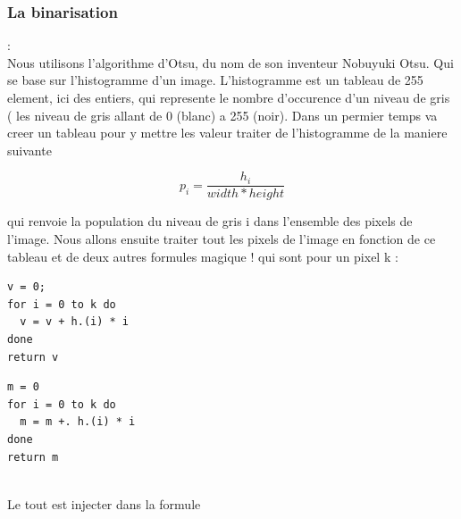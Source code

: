 \documentclass[12pt]{article}
\begin{document}
\subsubsection{La binarisation}
:\\
Nous utilisons l'algorithme d'Otsu, du nom de son inventeur Nobuyuki Otsu. Qui se base sur l'histogramme d'un image. L'histogramme est un tableau de 255 element, ici des entiers, qui represente le nombre d'occurence d'un niveau de gris ( les niveau de gris allant de 0 (blanc) a 255 (noir). Dans un permier temps va creer un tableau pour y mettre les valeur traiter de l'histogramme de la maniere suivante 
\begin{center}
\[ p_{i} = \frac{h_{i}} {width * height}\]
\end{center}
qui renvoie la population du niveau de gris i dans l'ensemble des pixels de l'image.
Nous allons ensuite traiter tout les pixels de l'image en fonction de ce tableau et de deux autres formules magique ! qui sont pour un pixel k :\\
\begin{minipage}[h]{5cm}
\begin{lstlisting}
v = 0;
for i = 0 to k do 
  v = v + h.(i) * i 
done
return v
\end{lstlisting}
\end{minipage}
\begin{minipage}[h]{5cm}
\begin{lstlisting}
m = 0
for i = 0 to k do
  m = m +. h.(i) * i
done 
return m
\end{lstlisting}
\end{minipage}
\vspace{0.8cm}
\\Le tout est injecter dans la formule
\end{document}
